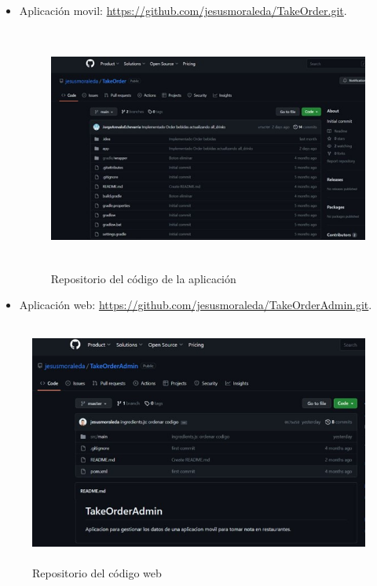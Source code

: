 \begin{itemize}

\item Aplicación movil: 
\url{https://github.com/jesusmoraleda/TakeOrder.git}. 

\begin{figure}[h]
\centering
\includegraphics[width=13cm, height=8cm]{Imagenes/Figuras/GitHubAppMovil.jpg}
\caption{Repositorio del código de la aplicación}\label{fig:githubapp}
\end{figure} 



\item Aplicación web: 
\url{https://github.com/jesusmoraleda/TakeOrderAdmin.git}. 

\end{itemize}


\begin{figure}[h]
\centering
\includegraphics[width=13cm, height=8cm]{Imagenes/Figuras/GitHubAppWeb.jpg}
\caption{Repositorio del código web}\label{fig:githubweb}
\end{figure} 


